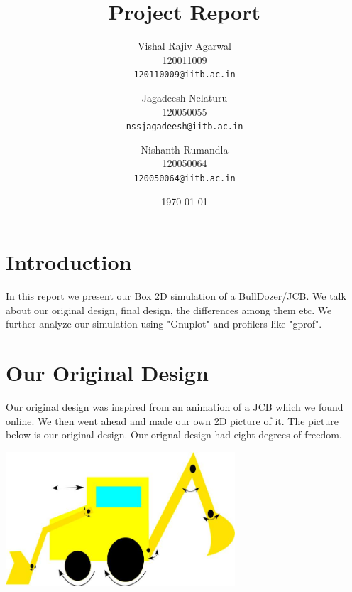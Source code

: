 \documentclass[11pt]{article}
\begin{document}
\title{Project Report}

\author{
	Vishal Rajiv Agarwal\\
	120011009\\
	\texttt{120110009@iitb.ac.in}
	\and
	Jagadeesh Nelaturu\\
	120050055\\
	\texttt{nssjagadeesh@iitb.ac.in}
	\and
	Nishanth Rumandla\\
	120050064\\
	\texttt{120050064@iitb.ac.in}}

\date{\today}

\maketitle

\section{Introduction}
	In this report we present our Box 2D simulation of a BullDozer/JCB. We talk about our original design, final design, the differences among them etc. We further analyze our simulation using "Gnuplot" and profilers like "gprof".  
\section{Our Original Design}
	Our original design was inspired from an animation of a JCB which we found online. We then went ahead and made our own 2D picture of it. The picture below is our original design. Our orignal design had eight degrees of freedom. 
	\begin{center}\includegraphics[height=5cm]{BullDozerDesign.jpg}\end{center}
\end{document}

